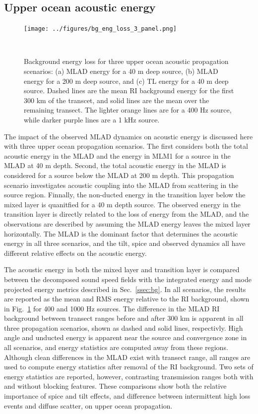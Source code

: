 \documentclass[preprint,NumberedRefs]{JASA}
\begin{document}
\subsection{Upper ocean acoustic energy}\label{ssec:energy}
\begin{figure}
\texttt{[image: ../figures/bg\_eng\_loss\_3\_panel.png]}
        \caption{Background energy loss for three upper ocean acoustic propagation scenarios: (a) MLAD energy for a 40 m deep source, (b) MLAD energy for a 200 m deep source, and (c) TL energy for a 40 m deep source. Dashed lines are the mean RI background energy for the first 300 km of the transcet, and solid lines are the mean over the remaining transect. The lighter orange lines are for a 400 Hz source, while darker purple lines are a 1 kHz source.}
    \label{fig:eng_bg_3}
\end{figure}
The impact of the observed MLAD dynamics on acoustic energy is discussed here with three upper ocean propagation scenarios. The first considers both the total acoustic energy in the MLAD and the energy in MLM1 for a source in the MLAD at 40 m depth. Second, the total acoustic energy in the MLAD is considered for a source below the MLAD at 200 m depth. This propagation scenario investigates acoustic coupling into the MLAD from scattering in the source region. Finnally, the non-ducted energy in the transition layer below the mixed layer is quanitfied for a 40 m depth source. The observed energy in the transition layer is directly related to the loss of energy from the MLAD, and the observations are described by assuming the MLAD energy leaves the mixed layer horizontally. The MLAD is the dominant factor that determines the acoustic energy in all three scenarios, and the tilt, spice and observed dynamics all have different relative effects on the acoustic energy.

The acoustic energy in both the mixed layer and transition layer is compared between the decomposed sound speed fields with the integrated energy and mode projected energy metrics described in Sec.~\ref{ssec:bg}. In all scenarios, the results are reported as the mean and RMS energy relative to the RI background, shown in Fig.~\ref{fig:eng_bg_3} for 400 and 1000 Hz sources. The difference in the MLAD RI background between transect ranges before and after 300 km is apparent in all three propagation scenarios, shown as dashed and solid lines, respectivly. High angle and unducted energy is apparent near the source and convergence zone in all scenarios, and energy statistics are computed away from these regions. Although clean differences in the MLAD exist with transect range, all ranges are used to compute energy statistics after removal of the RI background. Two sets of energy statistics are reported, however, contrasting transmission ranges both with and without blocking features. These comparisons show both the relative importance of spice and tilt effects, and difference between intermittent high loss events and diffuse scatter, on upper ocean propagation.
\end{document}
